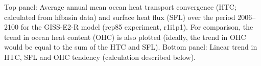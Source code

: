 \label{fig:giss}
Top panel: Average annual mean ocean heat transport convergence (HTC; calculated from hfbasin data) and surface heat flux (SFL) over the period 2006--2100 for the GISS-E2-R model (rcp85 experiment, r1i1p1). For comparison, the trend in ocean heat content (OHC) is also plotted (ideally, the trend in OHC would be equal to the sum of the HTC and SFL). Bottom panel: Linear trend in HTC, SFL and OHC tendency (calculation described below).